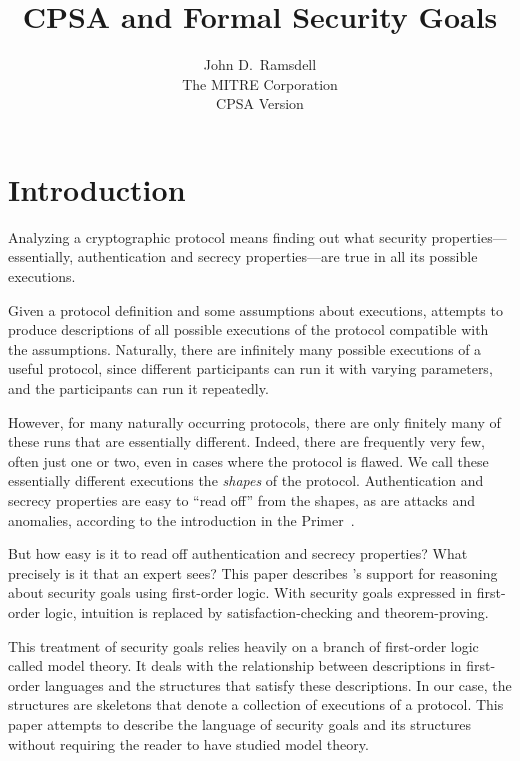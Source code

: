 \documentclass[12pt]{article}
\title{CPSA and Formal Security Goals}
\author{John D.~Ramsdell\\
  The MITRE Corporation\\ CPSA Version \version}
\begin{document}
\maketitle
\cpsacopying

\tableofcontents

\newpage

\listoffigures

\listoftables

\newpage

\section{Introduction}

\begin{sloppypar}
Analyzing a cryptographic protocol means finding out what security
properties---essentially, authentication and secrecy properties---are
true in all its possible executions.
\end{sloppypar}

Given a protocol definition and some assumptions about executions,
{\cpsa} attempts to produce descriptions of all possible executions of
the protocol compatible with the assumptions.  Naturally, there are
infinitely many possible executions of a useful protocol, since
different participants can run it with varying parameters, and the
participants can run it repeatedly.

However, for many naturally occurring protocols, there are only
finitely many of these runs that are essentially different.  Indeed,
there are frequently very few, often just one or two, even in cases
where the protocol is flawed.  We call these essentially different
executions the \emph{shapes} of the protocol.  Authentication and
secrecy properties are easy to ``read off'' from the shapes, as are
attacks and anomalies, according to the introduction in the {\cpsa}
Primer~\cite{cpsaprimer09}.

But how easy is it to read off authentication and secrecy properties?
What precisely is it that an expert sees?  This paper describes
{\cpsa}'s support for reasoning about security goals using first-order
logic.  With security goals expressed in first-order logic, intuition
is replaced by satisfaction-checking and theorem-proving.

This treatment of security goals relies heavily on a branch of
first-order logic called model theory.  It deals with the relationship
between descriptions in first-order languages and the structures that
satisfy these descriptions.  In our case, the structures are skeletons
that denote a collection of executions of a protocol.  This paper
attempts to describe the language of security goals and its
structures without requiring the reader to have studied model theory.
\end{document}
